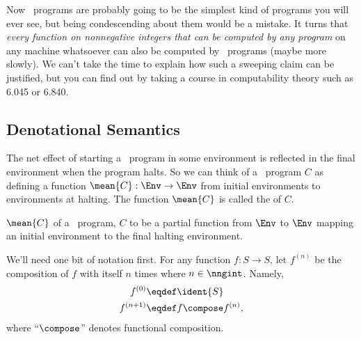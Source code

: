 Now \while\ programs are probably going to be the simplest kind of programs you will
ever see, but being condescending about them would be a mistake.  It turns
that \emph{every function on nonnegative integers that can be computed by
  any program} on any machine whatsoever can also be computed by \while\ programs
(maybe more slowly).  We can't take the time to explain how such a
sweeping claim can be justified, but you can find out by taking a course
in computability theory such as 6.045 or 6.840.

\subsection{Denotational Semantics}

The net effect of starting a \while\ program in some environment is reflected in the
final environment when the program halts.  So we can think of a \while\ program $C$
as defining a function $\mean{C}:\Env \to \Env$ from initial
environments to environments at halting.  The function $\mean{C}$ is
called the  of $C$.

$\mean{C}$ of a \while\ program, $C$ to be a partial function from $\Env$ to $\Env$
mapping an initial environment to the final halting environment.

We'll need one bit of notation first.  For any function $f:S \to S$, let
$f^{(n)}$ be the composition of $f$ with itself $n$ times where $n \in
\nngint$.   Namely,
\begin{align*}
f^{(0)} & \eqdef \ident{S}\\
f^{(n+1)} & \eqdef f \compose f^{(n)},
\end{align*}
where ``$\compose$'' denotes functional composition.

